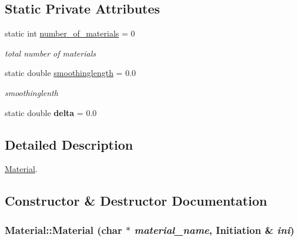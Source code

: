 \subsection*{Static Private Attributes}
\begin{CompactItemize}
\item 
\hypertarget{classMaterial_d8ce370248325165c1c2505895cc9658}{
static int \hyperlink{classMaterial_d8ce370248325165c1c2505895cc9658}{number\_\-of\_\-materials} = 0}
\label{classMaterial_d8ce370248325165c1c2505895cc9658}

\begin{CompactList}\small\item\em total number of materials \item\end{CompactList}\item 
\hypertarget{classMaterial_623d1eecd8b673ffbfb5934df209c5a7}{
static double \hyperlink{classMaterial_623d1eecd8b673ffbfb5934df209c5a7}{smoothinglength} = 0.0}
\label{classMaterial_623d1eecd8b673ffbfb5934df209c5a7}

\begin{CompactList}\small\item\em smoothinglenth \item\end{CompactList}\item 
\hypertarget{classMaterial_31f7c32c96eae2d91b5988d1945e9c18}{
static double \textbf{delta} = 0.0}
\label{classMaterial_31f7c32c96eae2d91b5988d1945e9c18}

\end{CompactItemize}


\subsection{Detailed Description}
\hyperlink{classMaterial}{Material}. 

\subsection{Constructor \& Destructor Documentation}
\hypertarget{classMaterial_16e68aae88c0ecd98a88654e4648aa75}{
\subsubsection[{Material}]{\setlength{\rightskip}{0pt plus 5cm}Material::Material (char $\ast$ {\em material\_\-name}, \/  {\bf Initiation} \& {\em ini})}}
\label{classMaterial_16e68aae88c0ecd98a88654e4648aa75}


